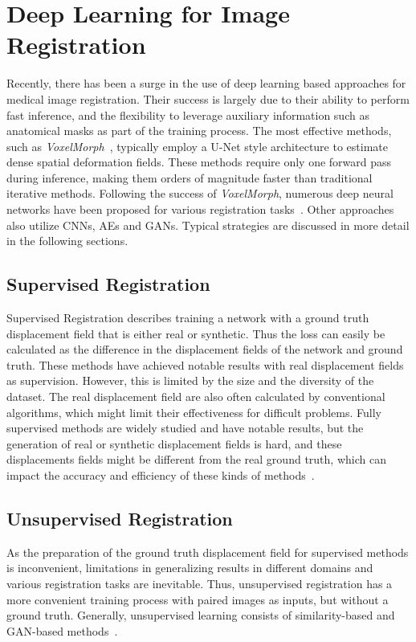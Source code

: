 \documentclass[english,version-2022-01]{uzl-thesis} %
\begin{document}
\section{Deep Learning for Image Registration}
Recently, there has been a surge in the use of deep learning based approaches for medical image registration. Their success is largely due to their ability to perform fast inference, and the flexibility to leverage auxiliary information such as anatomical masks as part of the training process. The most effective methods, such as \emph{VoxelMorph}~\cite{Voxelmorph}, typically employ a U-Net style architecture to estimate dense spatial deformation fields. These methods require only one forward pass during inference, making them orders of magnitude faster than traditional iterative methods. Following the success of \emph{VoxelMorph}, numerous deep neural networks have been proposed for various registration tasks~\cite{Fourier-Net+}. Other approaches also utilize CNNs, AEs and GANs. Typical strategies are discussed in more detail in the following sections.

\subsection{Supervised Registration}
Supervised Registration describes training a network with a ground truth displacement field that is either real or synthetic. Thus the loss can easily be calculated as the difference in the displacement fields of the network and ground truth. These methods have achieved notable results with real displacement fields as supervision. However, this is limited by the size and the diversity of the dataset. The real displacement field are also often calculated by conventional algorithms, which might limit their effectiveness for difficult problems. Fully supervised methods are widely studied and have notable results, but the generation of real or synthetic displacement fields is hard, and these displacements fields might be different from the real ground truth, which can impact the accuracy and efficiency of these kinds of methods~\cite{Zou2022}.

\subsection{Unsupervised Registration}
As the preparation of the ground truth displacement field for supervised methods is inconvenient, limitations in generalizing results in different domains and various registration tasks are inevitable. Thus, unsupervised registration has a more convenient training process with paired images as inputs, but without a ground truth. Generally, unsupervised learning consists of similarity-based and GAN-based methods~\cite{Zou2022}.
\end{document}
